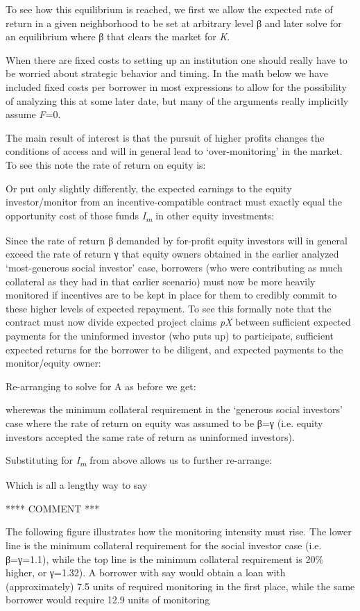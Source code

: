 \documentclass{article}
\begin{document}
To see how this equilibrium is reached, we first we allow the expected
rate of return in a given neighborhood to be set at arbitrary level β
and later solve for an equilibrium where β that clears the market for
\emph{K}.

When there are fixed costs to setting up an institution one should
really have to be worried about strategic behavior and timing. In the
math below we have included fixed costs per borrower in most expressions
to allow for the possibility of analyzing this at some later date, but
many of the arguments really implicitly assume \emph{F}=0.

The main result of interest is that the pursuit of higher profits
changes the conditions of access and will in general lead to
`over-monitoring' in the market. To see this note the rate of return on
equity is:

Or put only slightly differently, the expected earnings to the equity
investor/monitor from an incentive-compatible contract must exactly
equal the opportunity cost of those funds \emph{I\textsubscript{m}} in
other equity investments:

Since the rate of return β demanded by for-profit equity investors will
in general exceed the rate of return γ that equity owners obtained in
the earlier analyzed `most-generous social investor' case, borrowers
(who were contributing as much collateral as they had in that earlier
scenario) must now be more heavily monitored if incentives are to be
kept in place for them to credibly commit to these higher levels of
expected repayment. To see this formally note that the contract must now
divide expected project claims \emph{pX} between sufficient expected
payments for the uninformed investor (who puts up) to participate,
sufficient expected returns for the borrower to be diligent, and
expected payments to the monitor/equity owner:

Re-arranging to solve for A as before we get:

wherewas the minimum collateral requirement in the `generous social
investors' case where the rate of return on equity was assumed to be β=γ
(i.e. equity investors accepted the same rate of return as uninformed
investors).

Substituting for \emph{I\textsubscript{m}} from above allows us to
further re-arrange:

Which is all a lengthy way to say

**** COMMENT ***

The following figure illustrates how the monitoring intensity must rise.
The lower line is the minimum collateral requirement for the social
investor case (i.e. β=γ=1.1), while the top line is the minimum
collateral requirement is 20\% higher, or γ=1.32). A borrower with say
would obtain a loan with (approximately) 7.5 units of required
monitoring in the first place, while the same borrower would require
12.9 units of monitoring
\end{document}
